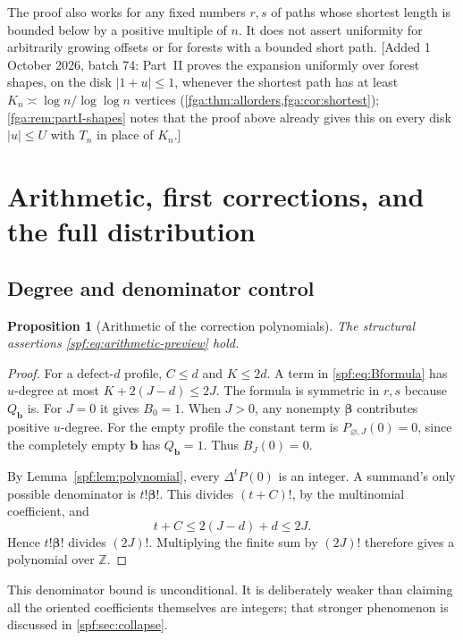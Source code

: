 \documentclass[11pt]{article}
\numberwithin{equation}{section}
\newtheorem{proposition}[theorem]{Proposition}
\theoremstyle{definition}
\theoremstyle{remark}
\theoremstyle{definition}
\newcommand{\Z}{\mathbb Z}
\newcommand{\betafac}{\boldsymbol\beta!}
\begin{document}
The proof also works for any fixed numbers $r,s$ of paths whose shortest
length is bounded below by a positive multiple of $n$. It does not assert
uniformity for arbitrarily growing offsets or for forests with a bounded
short path.
[Added 1 October 2026, batch 74: Part~II proves the expansion uniformly
over forest shapes, on the disk $|1+u|\le1$, whenever the shortest path has
at least $K_n\asymp\log n/\log\log n$ vertices
(\cref{fga:thm:allorders,fga:cor:shortest}); \cref{fga:rem:partI-shapes}
notes that the proof above already gives this on every disk $|u|\le U$
with $T_n$ in place of $K_n$.]

\section{Arithmetic, first corrections, and the full distribution}
\label{spf:sec:arithmetic}

\subsection{Degree and denominator control}

\begin{proposition}[Arithmetic of the correction polynomials]
\label{spf:prop:arithmetic}
The structural assertions \eqref{spf:eq:arithmetic-preview} hold.
\end{proposition}
\begin{proof}
For a defect-$d$ profile, $C\le d$ and $K\le2d$. A term in
\eqref{spf:eq:Bformula} has $u$-degree at most
$K+2(J-d)\le2J$. The formula is symmetric in $r,s$ because $Q_{\mathbf b}$ is.
For $J=0$ it gives $B_0=1$. When $J>0$, any nonempty
$\boldsymbol\beta$ contributes positive $u$-degree. For the empty profile the
constant term is $P_{\varnothing,J}(0)=0$, since the completely empty
$\mathbf b$ has $Q_{\mathbf b}=1$. Thus $B_J(0)=0$.

By Lemma~\ref{spf:lem:polynomial}, every $\Delta^tP(0)$ is an integer. A summand's only
possible denominator is $t!\betafac$. This divides $(t+C)!$, by the
multinomial coefficient, and
\begin{equation}
 t+C\le2(J-d)+d\le2J.
\end{equation}
Hence $t!\betafac$ divides $(2J)!$. Multiplying the finite sum by $(2J)!$
therefore gives a polynomial over $\Z$.
\end{proof}

This denominator bound is unconditional. It is deliberately weaker than
claiming all the oriented coefficients themselves are integers; that stronger
phenomenon is discussed in \cref{spf:sec:collapse}.
\end{document}
